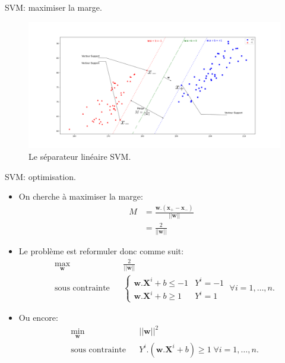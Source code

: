 \documentclass[8pt]{beamer}
\begin{document}
	\begin{frame}{SVM\@: maximiser la marge.}
		\begin{figure}[H]
			\includegraphics[width=\textwidth]{images/samples/svm_margin}
			\caption{\label{fig::margin} Le séparateur linéaire SVM.}
		\end{figure}
	\end{frame}

	\begin{frame}{SVM\@: optimisation.}
		\begin{itemize}
			\item  On cherche à maximiser la marge:
			\begin{align}
				M &= \frac{\textbf{w}.(\textbf{x}_+ - \textbf{x}_-)}{\vert\vert \textbf{w} \vert\vert} \\
				  &= \frac{2}{\vert\vert \textbf{w} \vert\vert}
			\end{align}
			\item  Le problème est reformuler donc comme suit:
			\begin{equation}
				\begin{aligned}
				& \max_{\textbf{w}}
				& & \frac{2}{\vert\vert \textbf{w} \vert\vert} \\
				& \text{sous contrainte}
				& & \begin{cases}
					\textbf{w}.\textbf{X}^i + b \leq -1 & Y^i = -1 \\
					\textbf{w}.\textbf{X}^i + b \geq 1 & Y^i = 1
				\end{cases} \; \forall i = 1, \dots, n.
				\end{aligned}
			\end{equation}
			\item  Ou encore:
			\begin{equation}
				\begin{aligned}
				& \min_{\textbf{w}}
				& & {\vert\vert \textbf{w} \vert\vert}^2 \\
				& \text{sous contrainte}
				& & Y^i.(\textbf{w}.\textbf{X}^i + b) \geq 1 \; \forall i = 1, \dots, n.
				\end{aligned}
			\end{equation}
		\end{itemize}
	\end{frame}
\end{document}
